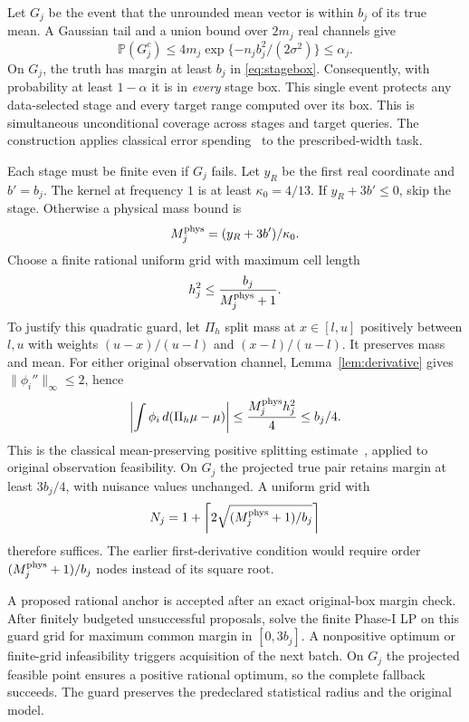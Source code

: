 \documentclass[10pt]{amsart}
\theoremstyle{definition}
\theoremstyle{remark}
\newcommand{\Prob}{\mathbb P}
\newcommand{\dd}{\,d}
\begin{document}
Let $G_j$ be the event that the unrounded mean vector is within $b_j$ of its true mean. A Gaussian tail and a union bound over $2m_j$ real channels give
\begin{equation}\label{eq:good}
 \Prob(G_j^c)\le4m_j\exp\{-n_jb_j^2/(2\sigma^2)\}\le\alpha_j.
\end{equation}
On $G_j$, the truth has margin at least $b_j$ in \eqref{eq:stagebox}. Consequently, with probability at least $1-\alpha$ it is in \emph{every} stage box. This single event protects any data-selected stage and every target range computed over its box. This is simultaneous unconditional coverage across stages and target queries. The construction applies classical error spending~\cite{howard} to the prescribed-width task.

Each stage must be finite even if $G_j$ fails. Let $y_R$ be the first real coordinate and $b'=b_j$. The kernel at frequency $1$ is at least $\kappa_0=4/13$. If $y_R+3b'\le0$, skip the stage. Otherwise a physical mass bound is
\[
 M_j^{\rm phys}=(y_R+3b')/\kappa_0.
\]
Choose a finite rational uniform grid with maximum cell length
\begin{equation}\label{eq:guard}
 h_j^2\le\frac{b_j}{M_j^{\rm phys}+1}.
\end{equation}
To justify this quadratic guard, let $\Pi_h$ split mass at $x\in[l,u]$ positively between $l,u$ with weights $(u-x)/(u-l)$ and $(x-l)/(u-l)$. It preserves mass and mean. For either original observation channel, Lemma~\ref{lem:derivative} gives $\|\phi_i''\|_\infty\le2$, hence
\[
 \left|\int\phi_i\dd(\Pi_h\mu-\mu)\right|
 \le \frac{M_j^{\rm phys}h_j^2}{4}\le b_j/4.
\]
This is the classical mean-preserving positive splitting estimate~\cite{pages}, applied to original observation feasibility. On $G_j$ the projected true pair retains margin at least $3b_j/4$, with nuisance values unchanged. A uniform grid with
\[
 N_j=1+\left\lceil2\sqrt{(M_j^{\rm phys}+1)/b_j}\right\rceil
\]
therefore suffices. The earlier first-derivative condition would require order $(M_j^{\rm phys}+1)/b_j$ nodes instead of its square root.

A proposed rational anchor is accepted after an exact original-box margin check. After finitely budgeted unsuccessful proposals, solve the finite Phase-I LP on this guard grid for maximum common margin in $[0,3b_j]$. A nonpositive optimum or finite-grid infeasibility triggers acquisition of the next batch. On $G_j$ the projected feasible point ensures a positive rational optimum, so the complete fallback succeeds. The guard preserves the predeclared statistical radius and the original model.
\end{document}
